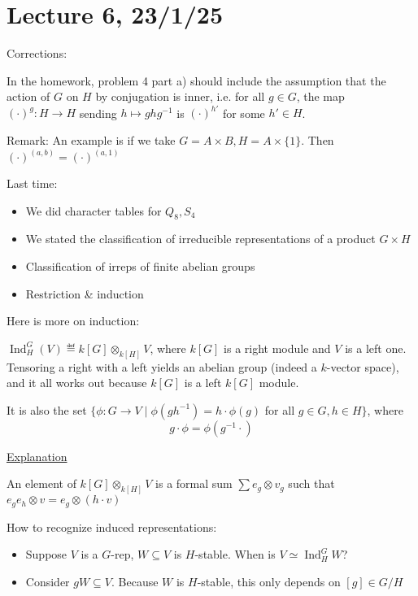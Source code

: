 \documentclass[x11names,reqno,14pt]{extarticle}
\DeclareMathOperator{\Ind}{Ind}
\begin{document}
\section*{Lecture 6, 23/1/25}

Corrections:

In the homework, problem 4 part a) should include the assumption that the action of $G$ on $H$ by conjugation is inner, i.e. for all $g \in G$, the map $(\cdot)^g:H\to H$ sending $h \mapsto g h g^{-1}$ is $(\cdot)^{h'}$ for some $h' \in H$. 

Remark: An example is if we take $G = A\times B, H = A\times\{1\}$. Then $(\cdot)^{(a,b)} = (\cdot)^{(a,1)}$

Last time:
\begin{itemize}

\item We did character tables for $Q_8,S_4$ 

\item We stated the classification of irreducible representations of a product $G\times H$

\item Classification of irreps of finite abelian groups

\item Restriction \& induction

\end{itemize}

Here is more on induction: 

$\Ind_H^G(V) \eqdef k[G]\otimes_{k[H]}V$, where $k[G]$ is a right module and $V$ is a left one. Tensoring a right with a left yields an abelian group (indeed a $k$-vector space), and it all works out because $k[G]$ is a left $k[G]$ module. 

It is also the set $\{\phi:G\to V \mid \phi(gh^{-1}) = h\cdot\phi(g)$ for all $g \in G, h \in H\}$, where 
\[
g\cdot\phi = \phi(g^{-1}\cdot)
\]

\underline{Explanation}

An element of $k[G]\otimes_{k[H]}V$ is a formal sum $\sum e_g\otimes v_g$ such that $e_ge_h\otimes v = e_g\otimes(h\cdot v)$

How to recognize induced representations:

\begin{itemize}

\item Suppose $V$ is a $G$-rep, $W \subseteq V$ is $H$-stable. When is $V \simeq \Ind_H^GW$?

\item Consider $gW\subseteq V$. Because $W$ is $H$-stable, this only depends on $[g]\in G/H$

\end{itemize}
\end{document}
